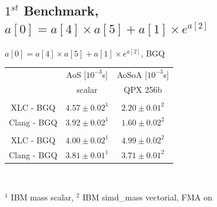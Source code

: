 \documentclass{beamer}
\begin{document}
\subsection*{$1^{st}$ Benchmark, $a[0] = a[4] \times a[5] + a[1] \times e^{a[2]}$}
\begin{frame}[fragile]
\begin{center}
$a[0] = a[4] \times a[5] + a[1] \times e^{a[2]}$, BGQ
\vspace{0.5cm}

\begin{tabular}{ c |  c  | c}
          &AoS $[10^{-3}$s] & AoSoA $[10^{-3}$s]\\
                       & scalar& QPX 256b  \\
 \color{C0}{float}                        &  &   \\
   \hline
   XLC - BGQ  &  $ 4.57 \pm 0.02^1 $ & \cellcolor{C2}$2.20\pm0.01^2$ \\
   Clang - BGQ & $3.92 \pm 0.02^1$ & \cellcolor{C2}$1.60\pm0.02^2$\\
   \hline
 \color{C0}{double} &   &    \\
   XLC - BGQ  &\cellcolor{C2}$4.00\pm0.02^1$&  $4.99\pm0.02^2$ \\
   Clang - BGQ & $3.81\pm0.01^1$ &\cellcolor{C2}$3.71\pm0.01^2$ \\
\end{tabular}\\
\end{center}

$^1$ IBM mass scalar,  $^2$ IBM simd\_mass vectorial,  FMA on

\vspace{0.5cm}
\end{frame}
\end{document}
